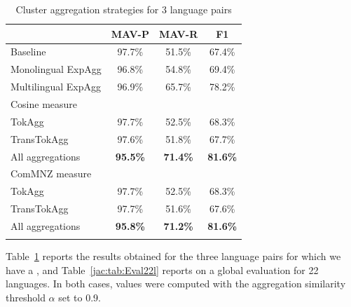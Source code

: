 \documentclass[output=paper]{langsci/langscibook}
\begin{document}
\begin{table}[h]
\centering
\begin{tabular}{lccc}\lsptoprule
&  \textnormal{MAV-P}  & \textnormal{MAV-R}  &  \textnormal{F1} \\ 
\midrule
Baseline                &     97.7\%   &  51.5\%  & 67.4\%  \\  
Monolingual ExpAgg   &  96.8\%   &  54.8\%  & 69.4\%  \\
Multilingual ExpAgg  &     96.9\%   &  65.7\%  & 78.2\%  \\ 
\midrule
\textnormal{Cosine measure}                 & & &   \\
TokAgg          &     97.7\%   &  52.5\%  & 68.3\%  \\   
TransTokAgg  &     97.6\%   &  51.8\%  & 67.7\%  \\  
All aggregations &     \textbf{95.5\%}   &  \textbf{71.4\%}  &  
\textbf{81.6\%}  \\
\midrule
\textnormal{ComMNZ measure}                         &    &   &   \\ 
TokAgg          &     97.7\%   &  52.5\%  & 68.3\%  \\   
TransTokAgg   &     97.7\%   &  51.6\%  & 67.6\%  \\  
All aggregations &     \textbf{95.8\%}   &  \textbf{71.2\%}  & 
\textbf{81.6\%}  \\ 
\lspbottomrule
\end{tabular}
\caption{Cluster aggregation strategies for 3 language pairs}
\label{jac:tab:Eval3l}
\end{table}


Table~\ref{jac:tab:Eval3l} reports the results obtained for the three language pairs 
for which we have a , and Table~\ref{jac:tab:Eval22l} reports on a 
global evaluation for 22 languages. In both cases, values were computed with the 
aggregation similarity threshold $\alpha$ set to 0.9.
\end{document}
